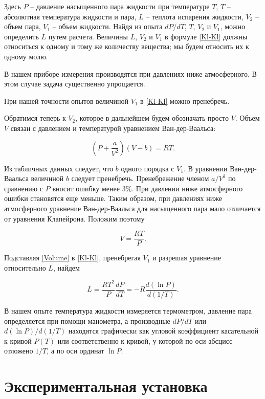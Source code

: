 \documentclass[12pt,a4paper]{article}
\begin{document}
Здесь $ P $ -- давление насыщенного пара жидкости при температуре $ T $, $ T $ -- абсолютная температура жидкости и пара, $ L $ -- теплота испарения жидкости, $ V_2 $ -- объем пара, $ V_1 $ -- объем жидкости. Найдя из опыта $ dP/dT $, $ T $, $ V_2 $ и $ V_1 $, можно определить $ L $ путем расчета. Величины $ L $, $ V_2 $ и $ V_1 $ в формуле \eqref{Kl-Kl} должны относиться к одному и тому же количеству вещества; мы будем относить их к одному молю.

В нашем приборе измерения производятся при давлениях ниже атмосферного. В этом случае задача существенно упрощается.

При нашей точности опытов величиной $ V_1 $ в \eqref{Kl-Kl} можно пренебречь.

Обратимся теперь к $ V_2 $, которое в дальнейшем будем обозначать просто $ V $. Объем $ V $ связан с давлением и температурой уравнением Ван-дер-Ваальса:

\begin{equation}\label{VDV}
	\left(P+\frac{a}{V^2}\right)\left(V-b\right)=RT.
\end{equation}

Из табличных данных следует, что $ b $ одного порядка с $ V_1 $. В уравнении Ван-дер-Ваальса величиной $ b $ следует пренебречь. Пренебрежение членом $ a/V^2 $ по сравнению с $ P $ вносит ошибку менее 3\%. При давлении ниже атмосферного ошибки становятся еще меньше. Таким образом, при давлениях ниже атмосферного уравнение Ван-дер-Ваальса для насыщенного пара мало отличается от уравнения Клапейрона. Положим поэтому

\begin{equation}\label{Volume}
	V=\frac{RT}{P}.
\end{equation}

Подставляя \eqref{Volume} в \eqref{Kl-Kl}, пренебрегая $ V_1 $ и разрешая уравнение относительно $ L $, найдем

\begin{equation}\label{final}
	L=\frac{RT^2}{P}\frac{dP}{dT}=-R\frac{d(\ln P)}{d(1/T)}.
\end{equation}

В нашем опыте температура жидкости измеряется термометром, давление пара определяется при помощи манометра, а производные $ dP/dT $ или $ d(\ln P)/d(1/T) $ находятся графически как угловой коэффициент касательной к кривой $ P(T) $ или соответственно к кривой, у которой по оси абсцисс отложено $ 1/T $, а по оси ординат $ \ln P $.


\section*{Экспериментальная установка}
\end{document}

